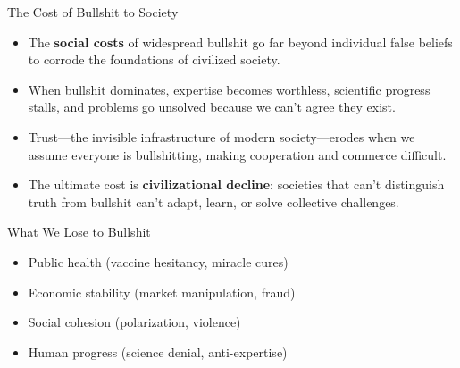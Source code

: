 \documentclass{beamer}
\begin{document}
	\begin{frame}{The Cost of Bullshit to Society}
		\begin{itemize}
			\item The \textbf{social costs} of widespread bullshit go far beyond individual false beliefs to corrode the foundations of civilized society.
			\item When bullshit dominates, expertise becomes worthless, scientific progress stalls, and problems go unsolved because we can't agree they exist.
			\item Trust—the invisible infrastructure of modern society—erodes when we assume everyone is bullshitting, making cooperation and commerce difficult.
			\item The ultimate cost is \textbf{civilizational decline}: societies that can't distinguish truth from bullshit can't adapt, learn, or solve collective challenges.
		\end{itemize}
		
		\begin{alertblock}{What We Lose to Bullshit}
			\scriptsize
			\begin{itemize}
				\item Public health (vaccine hesitancy, miracle cures)
				\item Economic stability (market manipulation, fraud)
				\item Social cohesion (polarization, violence)
				\item Human progress (science denial, anti-expertise)
			\end{itemize}
		\end{alertblock}
	\end{frame}
	
\end{document}
